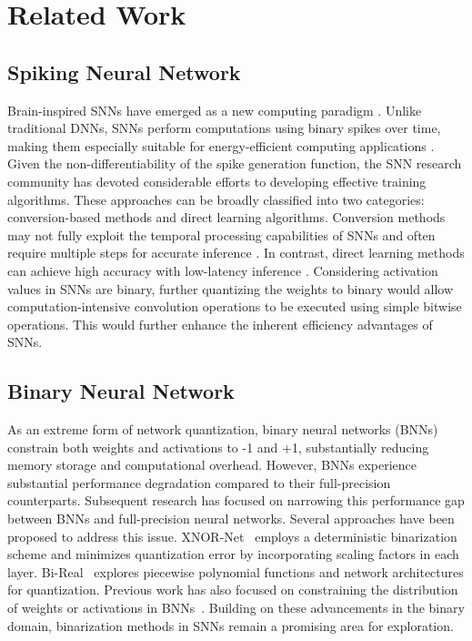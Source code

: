 \section{Related Work}
\subsection{Spiking Neural Network}

Brain-inspired SNNs have emerged as a new computing paradigm \cite{zhang2019mpd,tang2024neuromorphic}. Unlike traditional DNNs, SNNs perform computations using binary spikes over time, making them especially suitable for energy-efficient computing applications \cite{wang2024global,wei2023temporal}.
Given the non-differentiability of the spike generation function, the SNN research community has devoted considerable efforts to developing effective training algorithms. These approaches can be broadly classified into two categories: conversion-based methods and direct learning algorithms.
Conversion methods may not fully exploit the temporal processing capabilities of SNNs and often require multiple steps for accurate inference \cite{roy2019scaling,wang2020deep}. In contrast, direct learning methods can achieve high accuracy with low-latency inference \cite{wu2018spatio,wu2019direct,wang2024ternary}. 
Considering activation values in SNNs are binary, further quantizing the weights to binary would allow computation-intensive convolution operations to be executed using simple bitwise operations. This would further enhance the inherent efficiency advantages of SNNs.



\subsection{Binary Neural Network}
As an extreme form of network quantization, binary neural networks (BNNs) constrain both weights and activations to -1 and +1, substantially reducing memory storage and computational overhead. However, BNNs experience substantial performance degradation compared to their full-precision counterparts. Subsequent research has focused on narrowing this performance gap between BNNs and full-precision neural networks. Several approaches have been proposed to address this issue.
XNOR-Net~\cite{rastegari2016xnor} employs a deterministic binarization scheme and minimizes quantization error by incorporating scaling factors in each layer.
Bi-Real~\cite{liu2018bi} explores piecewise polynomial functions and network architectures for quantization. Previous work has also focused on constraining the distribution of weights or activations in BNNs~\cite{xu2021recu}. 
Building on these advancements in the binary domain, binarization methods in SNNs remain a promising area for exploration.




